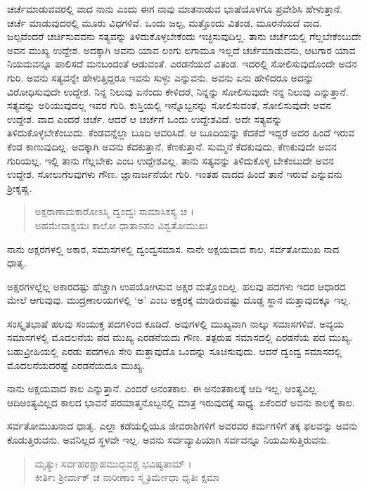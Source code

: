 ಚರ್ಚೆಮಾಡುವವರಲ್ಲಿ ವಾದ ನಾನು ಎಂದು ಈಗ ನಾವು ಮಾತನಾಡುವ ಭಾಷೆಯೊಳಗೂ ಪ್ರವೇಶಿಸಿ ಹೇಳುತ್ತಾನೆ. ಚರ್ಚೆ ಮಾಡುವುದರಲ್ಲಿ ಮೂರು ವಿಧಗಳಿವೆ. ಒಂದು ಜಲ್ಪ, ಮತ್ತೊಂದು ವಿತಂಡ, ಮೂರನೆಯದೆ ವಾದ. ಜಲ್ಪವೆಂದರೆ ಚರ್ಚಿಸುವವನು ಸತ್ಯವನ್ನು ತಿಳಿದುಕೊಳ್ಳಬೇಕೆಂದು ಇಚ್ಛಿಸುವುದಿಲ್ಲ. ತಾನು ಚರ್ಚೆಯಲ್ಲಿ ಗೆಲ್ಲಬೇಕೆಂಬುದೇ ಅವನ ಮುಖ್ಯ ಉದ್ದೇಶ. ಅದಕ್ಕಾಗಿ ಅವನು ಯಾವ ಲಂಗು ಲಗಾಮೂ ಇಲ್ಲದೆ ಚರ್ಚೆಮಾಡುವನು, ಆಟಗಾರ ಯಾವ ನಿಯಮವನ್ನೂ ಪಾಲಿಸದೆ ಮನಬಂದಂತೆ ಆಡುವಂತೆ. ಎರಡನೆಯದೆ ವಿತಂಡ. ಇದರಲ್ಲಿ ಸೋಲಿಸುವುದೊಂದೇ ಅವನ ಗುರಿ. ಅವನು ಸತ್ಯವನ್ನೇ ಹೇಳುತ್ತಿದ್ದರೂ ಇವನು ಸುಳ್ಳು ಎನ್ನುವನು. ಅವನು ಏನು ಹೇಳಿದರೂ ಅದನ್ನು ವಿರೋಧಿಸುವುದೇ ಉದ್ದೇಶ. ನಿನ್ನ ನಿಲುವು ಏನೆಂದು ಕೇಳಿದರೆ, ನಿನ್ನನ್ನು ಸೋಲಿಸುವುದೇ ನನ್ನ ನಿಲುವು ಎನ್ನುತ್ತಾನೆ. ಸತ್ಯವನ್ನು ಅರಿಯುವುದಲ್ಲ ಇವರ ಗುರಿ. ಕುಸ್ತಿಯಲ್ಲಿ ಇನ್ನೊಬ್ಬನನ್ನು ಸೋಲಿಸುವಂತೆ, ಸೋಲಿಸುವುದೇ ಅವನ ಉದ್ದೇಶ. ವಾದ ಎಂದರೆ ಚರ್ಚೆ. ಆದರೆ ಆ ಚರ್ಚೆಗೆ ಒಂದು ಉದ್ದೇಶವಿದೆ. ಅದೇ ಸತ್ಯವನ್ನು ತಿಳಿದುಕೊಳ್ಳಬೇಕೆಂಬುದು. ಕೆಂಡವನ್ನೆಲ್ಲಾ ಬೂದಿ ಆವರಿಸಿದೆ. ಆ ಬೂದಿಯನ್ನು ಕೆದಕದೆ ಇದ್ದರೆ ಅದರ ಹಿಂದೆ ಇರುವ ಕೆಂಡ ಕಾಣುವುದಿಲ್ಲ. ಅದಕ್ಕಾಗಿ ಅವನು ಕೆದಕುತ್ತಾನೆ, ಕೆಣಕುತ್ತಾನೆ. ಸುಮ್ಮನೆ ಕೆದಕುವುದು, ಕೆಣಕುವುದೇ ಅವನ ಗುರಿಯಲ್ಲ. ಇಲ್ಲಿ ತಾನು ಗೆಲ್ಲಬೇಕು ಎಂಬ ಉದ್ದೇಶವಿಲ್ಲ. ತಾನು ಸತ್ಯವನ್ನು ತಿಳಿದುಕೊಳ್ಳ ಬೇಕೆಂಬುದೇ ಅವನ ಉದ್ದೇಶ. ಸೋಲುಗೆಲವುಗಳು ಗೌಣ. ಜ್ಞಾನಾರ್ಜನೆಯೇ ಗುರಿ. ಇಂತಹ ವಾದದ ಹಿಂದೆ ತಾನೆ ಇರುವೆ ಎನ್ನುವನು ಶ್ರೀಕೃಷ್ಣ.

\begin{verse}
ಅಕ್ಷರಾಣಾಮಕಾರೋಽಸ್ಮಿ ದ್ವಂದ್ವಃ ಸಾಮಾಸಿಕಸ್ಯ ಚ ।\\ಅಹಮೇವಾಕ್ಷಯಃ ಕಾಲೋ ಧಾತಾಽಹಂ ವಿಶ್ವತೋಮುಖಃ 
\end{verse}

{\small ನಾನು ಅಕ್ಷರಗಳಲ್ಲಿ ಅಕಾರ, ಸಮಾಸಗಳಲ್ಲಿ ದ್ವಂದ್ವಸಮಾಸ. ನಾನೇ ಅಕ್ಷಯವಾದ ಕಾಲ, ಸರ್ವತೋಮುಖ ನಾದ ಧಾತೃ.}

ಅಕ್ಷರಗಳಲ್ಲೆಲ್ಲ ಅಕಾರದಷ್ಟು ಹೆಚ್ಚಾಗಿ ಉಪಯೋಗಿಸುವ ಅಕ್ಷರ ಮತ್ತೊಂದಿಲ್ಲ. ಹಲವು ಪದಗಳು ಇದರ ಆಧಾರದ ಮೇಲೆ ಆಗುವುವು. ಮುದ್ರಣಾಲಯಗಳಲ್ಲಿ ‘ಅ’ ಎಂಬ ಅಕ್ಷರಕ್ಕೆ ಮಾಡಿರುವಷ್ಟು ದೊಡ್ಡ ಸ್ಥಾನ ಮತ್ತಾವುದಕ್ಕೂ ಇಲ್ಲ.

ಸಂಸ್ಕೃತಭಾಷೆ ಹಲವು ಸಂಯುಕ್ತ ಪದಗಳಿಂದ ಕೂಡಿದೆ. ಅವುಗಳಲ್ಲಿ ಮುಖ್ಯವಾಗಿ ನಾಲ್ಕು ಸಮಾಸಗಳಿವೆ. ಅವ್ಯಯ ಸಮಾಸಗಳಲ್ಲಿ ಮೊದಲನೆಯ ಪದ ಮುಖ್ಯ ಎರಡನೆಯದು ಗೌಣ. ತತ್ಪರುಷ ಸಮಾಸದಲ್ಲಿ ಎರಡನೆಯ ಪದ ಮುಖ್ಯ. ಬಹುವ್ರೀಹಿಯಲ್ಲಿ ಎರಡು ಪದಗಳೂ ಸೇರಿ ಮತ್ತಾವುದೊ ಒಂದನ್ನು ಸೂಚಿಸುವುದು. ಆದರೆ ದ್ವಂದ್ವ ಸಮಾಸದಲ್ಲಿ ಮೊದಲನೆಯದರಷ್ಟೆ ಎರಡನೆಯದೂ ಮುಖ್ಯ.

ನಾನು ಅಕ್ಷಯವಾದ ಕಾಲ ಎನ್ನುತ್ತಾನೆ. ಎಂದರೆ ಅನಂತಕಾಲ. ಈ ಅನಂತಕಾಲಕ್ಕೆ ಆದಿ ಇಲ್ಲ, ಅಂತ್ಯವಿಲ್ಲ. ಆದಿಅಂತ್ಯವಿಲ್ಲದ ಕಾಲದ ಭಾವನೆ ಪರಮಾತ್ಮನೊಬ್ಬನಲ್ಲಿ ಮಾತ್ರ ಇರುವುದಕ್ಕೆ ಸಾಧ್ಯ. ಏಕೆಂದರೆ ಅವನು ಕಾಲಕ್ಕೆ ಕಾಲ.

ಸರ್ವತೋಮುಖನಾದ ಧಾತೃ. ಎಲ್ಲಾ ಕಡೆಯಲ್ಲಿಯೂ ಜೀವರಾಶಿಗಳಿಗೆ ಅವರವರ ಕರ್ಮಗಳಿಗೆ ತಕ್ಕ ಫಲವನ್ನು ಅವನು ಕೊಡುತ್ತಿರುವನು. ಅವನಿಲ್ಲದ ಸ್ಥಳವೇ ಇಲ್ಲ. ಅವನು ಸರ್ವವ್ಯಾಪಿಯಾಗಿ ಸರ್ವವನ್ನೂ ನಿಯಮಿಸುತ್ತಿರುವನು.

\begin{verse}
ಮೃತ್ಯುಃ ಸರ್ವಹರಶ್ಚಾಹಮುದ್ಭವಶ್ಚ ಭವಿಷ್ಯತಾಮ್ ।\\ಕೀರ್ತಿಃ ಶ್ರೀರ್ವಾಕ್ ಚ ನಾರೀಣಾಂ ಸ್ಮೃತಿರ್ಮೇಧಾ ಧೃತಿಃ ಕ್ಷಮಾ 
\end{verse}

